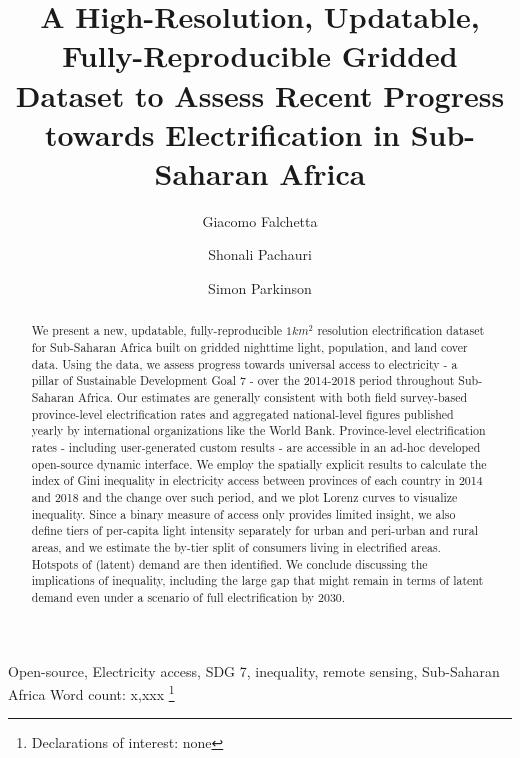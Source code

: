 \documentclass[preprint,12pt]{elsarticle}
\newcommand\blfootnote[1]{%
  \begingroup
  \renewcommand\thefootnote{}\footnote{#1}%
  \addtocounter{footnote}{-1}%
  \endgroup
}
\begin{document}
\begin{frontmatter}

\title{A High-Resolution, Updatable, Fully-Reproducible Gridded Dataset to Assess Recent Progress towards Electrification in Sub-Saharan Africa}

\author[uno,due]{Giacomo Falchetta}

\author[due]{Shonali Pachauri}
\author[due]{Simon Parkinson}



\address[uno]{Fondazione Eni Enrico Mattei (FEEM), Corso Magenta 63, 2013 , Milan, Italy}
\address[due]{International Institute for Applied Systems Analysis, Schossplatz 1, Laxenburg, Austria}

\begin{abstract}
We present a new, updatable, fully-reproducible $1 km^2$ resolution electrification dataset for Sub-Saharan Africa built on gridded nighttime light, population, and land cover data. Using the data, we assess progress towards universal access to electricity - a pillar of Sustainable Development Goal 7 - over the 2014-2018 period throughout Sub-Saharan Africa. Our estimates are generally consistent with both field survey-based province-level electrification rates and aggregated national-level figures published yearly by international organizations like the World Bank. Province-level electrification rates - including user-generated custom results - are accessible in an ad-hoc developed open-source dynamic interface. We employ the spatially explicit results to calculate the index of Gini inequality in electricity access between provinces of each country in 2014 and 2018 and the change over such period, and we plot Lorenz curves to visualize inequality. Since a binary measure of access only provides limited insight, we also  define tiers of per-capita light intensity separately for urban and peri-urban and rural areas, and we estimate the by-tier split of consumers living in electrified areas. Hotspots of (latent) demand are then identified. We conclude discussing the implications of inequality, including the large gap that might remain in terms of latent demand even under a scenario of full electrification by 2030. 
\end{abstract}


\begin{keyword}
Open-source, Electricity access, SDG 7, inequality, remote sensing, Sub-Saharan Africa \newline
Word count: x,xxx 
\blfootnote{
\noindent
Declarations of interest: none}
\end{keyword}
\end{frontmatter}
\linenumbers
\end{document}
